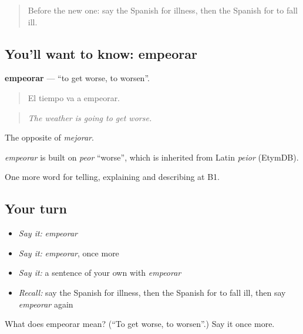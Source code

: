\label{lesson:ES-C732-empeorar}



\begin{quote}
Before the new one: say the Spanish for illness, then the Spanish for to fall ill.
\end{quote}

\subsection*{You'll want to know: empeorar}
\textbf{empeorar} — \textquotedblleft{}to get worse, to worsen\textquotedblright{}.

\begin{quote}
El tiempo va a empeorar.
\end{quote}

\begin{quote}
\emph{The weather is going to get worse.}
\end{quote}

The opposite of \emph{mejorar}.

\begin{cousinweb}
\emph{empeorar} is built on \emph{peor} \textquotedblleft{}worse\textquotedblright{}, which is inherited from Latin \emph{peior} (EtymDB).
\end{cousinweb}

\begin{grammarlens}[title={What you've built}]
One more word for telling, explaining and describing at B1.
\end{grammarlens}

\subsection*{Your turn}
\begin{itemize}
\raggedright
  \item \emph{Say it:} \emph{empeorar}
  \item \emph{Say it:} \emph{empeorar}, once more
  \item \emph{Say it:} a sentence of your own with \emph{empeorar}
  \item \emph{Recall:} say the Spanish for illness, then the Spanish for to fall ill, then say \emph{empeorar} again
\end{itemize}

\begin{tcolorbox}[breakable,colback=teal!4,colframe=teal!35!black,title={Before you move on}]
What does empeorar mean? (\textquotedblleft{}To get worse, to worsen\textquotedblright{}.) Say it once more.
\end{tcolorbox}
